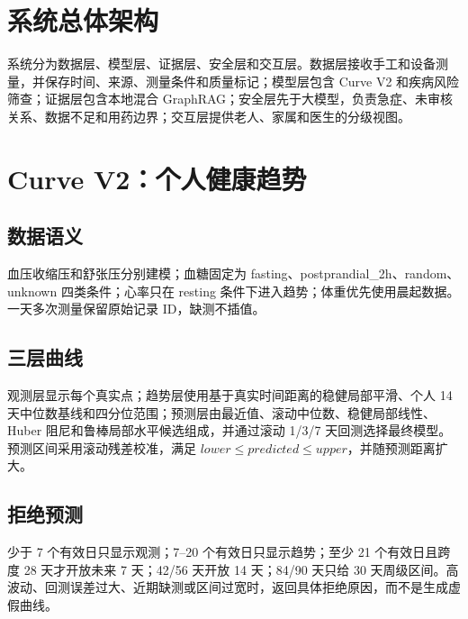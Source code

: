 \documentclass[UTF8,a4paper,zihao=-4]{ctexart}
\begin{document}
\section{系统总体架构}
系统分为数据层、模型层、证据层、安全层和交互层。数据层接收手工和设备测量，并保存时间、来源、测量条件和质量标记；模型层包含 Curve V2 和疾病风险筛查；证据层包含本地混合 GraphRAG；安全层先于大模型，负责急症、未审核关系、数据不足和用药边界；交互层提供老人、家属和医生的分级视图。

\begin{center}
\end{center}

\section{Curve V2：个人健康趋势}
\subsection{数据语义}
血压收缩压和舒张压分别建模；血糖固定为 fasting、postprandial\_2h、random、unknown 四类条件；心率只在 resting 条件下进入趋势；体重优先使用晨起数据。一天多次测量保留原始记录 ID，缺测不插值。

\subsection{三层曲线}
观测层显示每个真实点；趋势层使用基于真实时间距离的稳健局部平滑、个人 14 天中位数基线和四分位范围；预测层由最近值、滚动中位数、稳健局部线性、Huber 阻尼和鲁棒局部水平候选组成，并通过滚动 1/3/7 天回测选择最终模型。预测区间采用滚动残差校准，满足 $lower\le predicted\le upper$，并随预测距离扩大。

\subsection{拒绝预测}
少于 7 个有效日只显示观测；7--20 个有效日只显示趋势；至少 21 个有效日且跨度 28 天才开放未来 7 天；42/56 天开放 14 天；84/90 天只给 30 天周级区间。高波动、回测误差过大、近期缺测或区间过宽时，返回具体拒绝原因，而不是生成虚假曲线。
\end{document}
